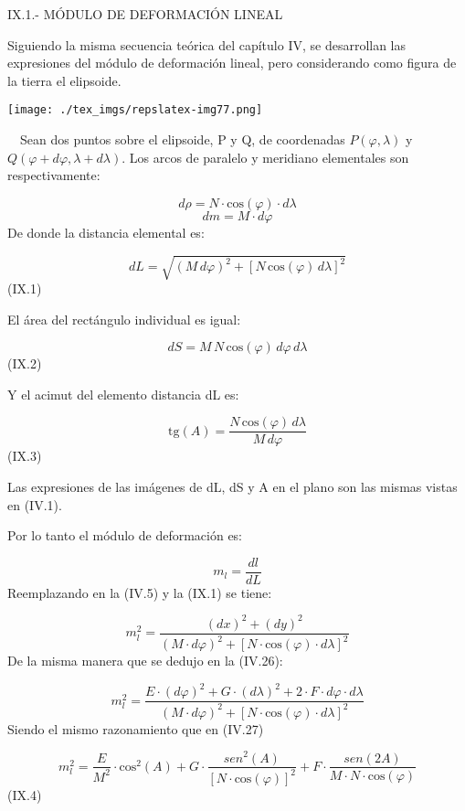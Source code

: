 \documentclass[]{article}
\begin{document}
IX.1.- MÓDULO DE DEFORMACIÓN LINEAL

Siguiendo la misma secuencia teórica del capítulo IV, se desarrollan las
expresiones del módulo de deformación lineal, pero considerando como
figura de la tierra el elipsoide.

\texttt{[image: ./tex\_imgs/repslatex-img77.png]}

~~Sean dos puntos sobre el elipsoide, P y Q, de coordenadas
\({P(\varphi ,\lambda )}\) y \({Q(\varphi +d\varphi ,\lambda
+d\lambda )}\). Los arcos de paralelo y meridiano elementales son
respectivamente:

\[{d\rho =N\cdot \text{cos}\left(\varphi \right)\cdot
d\lambda }\] \[{dm=M\cdot d\varphi }\] De donde la distancia elemental
es:

\[ dL=\sqrt{\left(M\, d\varphi \right)^{2}+\left[N\, \text{cos}\left(\varphi \right)\, d\lambda \right]^{2}} \]
(IX.1)

El área del rectángulo individual es igual:

\[dS=M \, N \, \text{cos}\left(\varphi \right) \, d\varphi \, d\lambda\]
(IX.2)

Y el acimut del elemento distancia dL es:

\[\text{tg}\left(A\right)=\frac{N \, \text{cos}\left(\varphi \right) \, d\lambda}{M \, d\varphi}\]
(IX.3)

Las expresiones de las imágenes de dL, dS y A en el plano son las mismas
vistas en (IV.1).

Por lo tanto el módulo de deformación es:

\[{m_{{l}}=\frac{dl}{dL}}\] Reemplazando en la (IV.5) y la (IX.1) se
tiene:

\[{m_{{l}}^{{2}}=\frac{\left(dx\right)^{{2}}+\left(dy\right)^{{2}}}{\left(M\cdot
d\varphi \right)^{{2}}+\left[N\cdot \text{cos}\left(\varphi
\right)\cdot d\lambda \right]^{{2}}}}\] De la misma manera que se dedujo
en la (IV.26):

\[{m_{{l}}^{{2}}=\frac{E\cdot \left(d\varphi \right)^{{2}}+G\cdot
\left(d\lambda \right)^{{2}}+2\cdot F\cdot d\varphi
\cdot d\lambda }{\left(M\cdot d\varphi
\right)^{{2}}+\left[N\cdot \text{cos}\left(\varphi \right)\cdot
d\lambda \right]^{{2}}}}\] Siendo el mismo razonamiento que en (IV.27)

\[{m_{{l}}^{{2}}=\frac{E}{M^{{2}}}\cdot
\text{cos}^{{2}}\left(A\right)+G\cdot
{\frac{sen^{{2}}\left(A\right)}{\left[N\cdot
\text{cos}\left(\varphi \right)\right]^{{2}}}}+F\cdot
{\frac{sen\left(2A\right)}{M\cdot N\cdot
\text{cos}\left(\varphi \right)}}}\] (IX.4)
\end{document}
